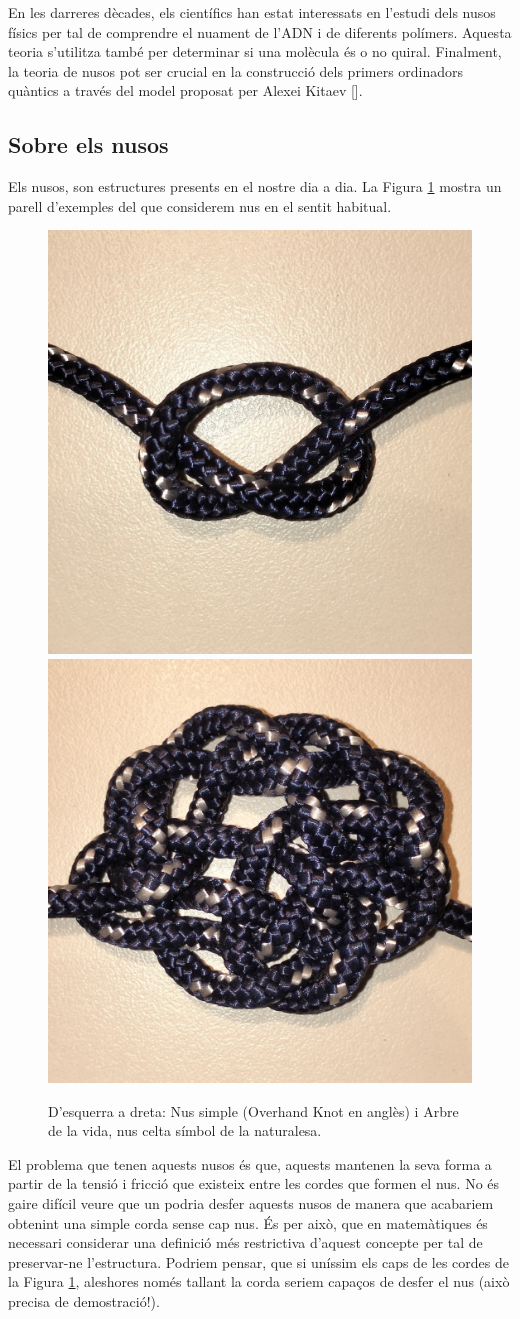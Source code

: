 En les darreres dècades, els científics han estat interessats en l'estudi dels nusos físics per tal de comprendre el nuament de l'ADN i de diferents polímers. Aquesta teoria s'utilitza també per determinar si una molècula és o no quiral. Finalment, la teoria de nusos pot ser crucial en la construcció dels primers ordinadors quàntics a través del model proposat per Alexei Kitaev [\cite{computingwithquantumknots}].\\

\subsection{Sobre els nusos}\label{subsec:sobreelsnusos}
Els nusos, son estructures presents en el nostre dia a dia. La Figura \ref{fig:exemples de nusos} mostra un parell d'exemples del que considerem nus en el sentit habitual.\\

\begin{figure}
  \centering
  \includegraphics[width=0.46\linewidth]{img/nus simple.jpg}
  \includegraphics[width=0.46\linewidth]{img/arbre de la vida.jpg}
  \caption{D'esquerra a dreta: Nus simple (Overhand Knot en anglès) i Arbre de la vida, nus celta símbol de la naturalesa.
  }\label{fig:exemples de nusos}
\end{figure}

El problema que tenen aquests nusos és que, aquests mantenen la seva forma a partir de la tensió i fricció que existeix entre les cordes que formen el nus. No és gaire difícil veure que un podria desfer aquests nusos de manera que acabariem obtenint una simple corda sense cap nus. És per això, que en matemàtiques és necessari considerar una definició més restrictiva d'aquest concepte per tal de preservar-ne l'estructura. Podriem pensar, que si uníssim els caps de les cordes de la Figura \ref{fig:exemples de nusos}, aleshores només tallant la corda seriem capaços de desfer el nus (això precisa de demostració!).